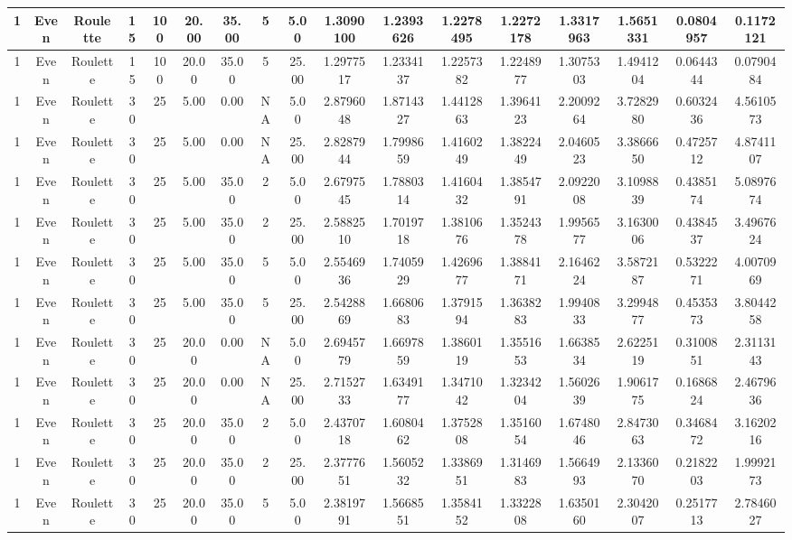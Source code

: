 \begin{longtable}{ | c | c | c | c | c | c | c | c | c | c | c | c | c | c | c | c | c | }
	\hline
	1	&	Even	&	Roulette	&	15	&	100	&	20.00	&	35.00	&	5	&	5.00	&	1.3090100	&	1.2393626	&	1.2278495	&	1.2272178	&	1.3317963	&	1.5651331	&	0.0804957	&	0.1172121 \\
	\hline
	1	&	Even	&	Roulette	&	15	&	100	&	20.00	&	35.00	&	5	&	25.00	&	1.2977517	&	1.2334137	&	1.2257382	&	1.2248977	&	1.3075303	&	1.4941204	&	0.0644344	&	0.0790484 \\
	\hline
	1	&	Even	&	Roulette	&	30	&	25	&	5.00	&	0.00	&	NA	&	5.00	&	2.8796048	&	1.8714327	&	1.4412863	&	1.3964123	&	2.2009264	&	3.7282980	&	0.6032436	&	4.5610573 \\
	\hline
	1	&	Even	&	Roulette	&	30	&	25	&	5.00	&	0.00	&	NA	&	25.00	&	2.8287944	&	1.7998659	&	1.4160249	&	1.3822449	&	2.0460523	&	3.3866650	&	0.4725712	&	4.8741107 \\
	\hline
	1	&	Even	&	Roulette	&	30	&	25	&	5.00	&	35.00	&	2	&	5.00	&	2.6797545	&	1.7880314	&	1.4160432	&	1.3854791	&	2.0922008	&	3.1098839	&	0.4385174	&	5.0897674 \\
	\hline
	1	&	Even	&	Roulette	&	30	&	25	&	5.00	&	35.00	&	2	&	25.00	&	2.5882510	&	1.7019718	&	1.3810676	&	1.3524378	&	1.9956577	&	3.1630006	&	0.4384537	&	3.4967624 \\
	\hline
	1	&	Even	&	Roulette	&	30	&	25	&	5.00	&	35.00	&	5	&	5.00	&	2.5546936	&	1.7405929	&	1.4269677	&	1.3884171	&	2.1646224	&	3.5872187	&	0.5322271	&	4.0070969 \\
	\hline
	1	&	Even	&	Roulette	&	30	&	25	&	5.00	&	35.00	&	5	&	25.00	&	2.5428869	&	1.6680683	&	1.3791594	&	1.3638283	&	1.9940833	&	3.2994877	&	0.4535373	&	3.8044258 \\
	\hline
	1	&	Even	&	Roulette	&	30	&	25	&	20.00	&	0.00	&	NA	&	5.00	&	2.6945779	&	1.6697859	&	1.3860119	&	1.3551653	&	1.6638534	&	2.6225119	&	0.3100851	&	2.3113143 \\
	\hline
	1	&	Even	&	Roulette	&	30	&	25	&	20.00	&	0.00	&	NA	&	25.00	&	2.7152733	&	1.6349177	&	1.3471042	&	1.3234204	&	1.5602639	&	1.9061775	&	0.1686824	&	2.4679636 \\
	\hline
	1	&	Even	&	Roulette	&	30	&	25	&	20.00	&	35.00	&	2	&	5.00	&	2.4370718	&	1.6080462	&	1.3752808	&	1.3516054	&	1.6748046	&	2.8473063	&	0.3468472	&	3.1620216 \\
	\hline
	1	&	Even	&	Roulette	&	30	&	25	&	20.00	&	35.00	&	2	&	25.00	&	2.3777651	&	1.5605232	&	1.3386951	&	1.3146983	&	1.5664993	&	2.1336070	&	0.2182203	&	1.9992173 \\
	\hline
	1	&	Even	&	Roulette	&	30	&	25	&	20.00	&	35.00	&	5	&	5.00	&	2.3819791	&	1.5668551	&	1.3584152	&	1.3322808	&	1.6350160	&	2.3042007	&	0.2517713	&	2.7846027 \\

\end{longtable}

